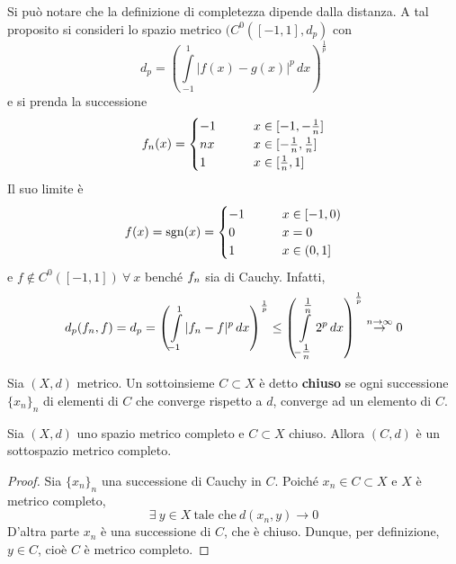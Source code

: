 \begin{oss}
    Si può notare che la definizione di completezza dipende dalla distanza. A tal proposito si consideri lo spazio metrico $(C^0([-1,1], d_p)$ con 
    \begin{equation*}
        d_p=\left(\int\limits_{-1}^{1}{|f(x)-g(x)|^p\, dx}\right)^\frac{1}{p}
    \end{equation*}
    e si prenda la successione
    \begin{equation*}
        f_n(x) = \begin{cases}
            -1 &\qquad x \in [-1, -\frac{1}{n}]\\
            nx &\qquad x \in [-\frac{1}{n}, \frac{1}{n}]\\
            1 &\qquad x \in [\frac{1}{n}, 1]
        \end{cases}
    \end{equation*}
    Il suo limite è
    \begin{equation*}
        f(x)= \operatorname{sgn}(x)=\begin{cases}
            -1 &\qquad x \in [-1,0)\\
            0 &\qquad x =0\\
            1 &\qquad x \in (0, 1]
        \end{cases}
    \end{equation*}
    e $f\notin C^0([-1, 1])\ \forall\ x$
    benché $f_n$ sia di Cauchy. Infatti, 
    \begin{equation*}
        d_p(f_n, f)=  d_p=\left(\int\limits_{-1}^{1}{|f_n-f|^p\, dx}\right)^\frac{1}{p} \leq \left(\int\limits_{-\tfrac{1}{n}}^{\tfrac{1}{n}}{2^p\, dx}\right)^\frac{1}{p} \overset{n \to \infty}{\to }0
    \end{equation*}
\end{oss}
\begin{definition} \label{Def: Spazio chiuso}
    Sia $(X, d)$ metrico. Un sottoinsieme $C \subset X$ è detto \textbf{chiuso} se ogni successione $\{x_n\}_n$ di elementi di $C$ che converge rispetto a $d$, converge ad un elemento di $C$.
\end{definition}
\begin{theorem} \label{Teo: Sottospazio chiuso di un completo è completo}
    Sia $(X,d)$ uno spazio metrico completo e $C \subset X$ chiuso. Allora $(C, d)$ è un sottospazio metrico completo.
\end{theorem}
\begin{proof}
    Sia $\{x_n\}_n$ una successione di Cauchy in $C$. Poiché $x_n \in C \subset X$ e $X$ è metrico completo, 
    \begin{equation}
        \exists\ y \in X\ \text{tale che}\ d(x_n, y)\to 0
    \end{equation}
    D'altra parte $x_n$ è una successione di $C$, che è chiuso. Dunque, per definizione, $y \in C$, cioè $C$ è metrico completo.
\end{proof}
